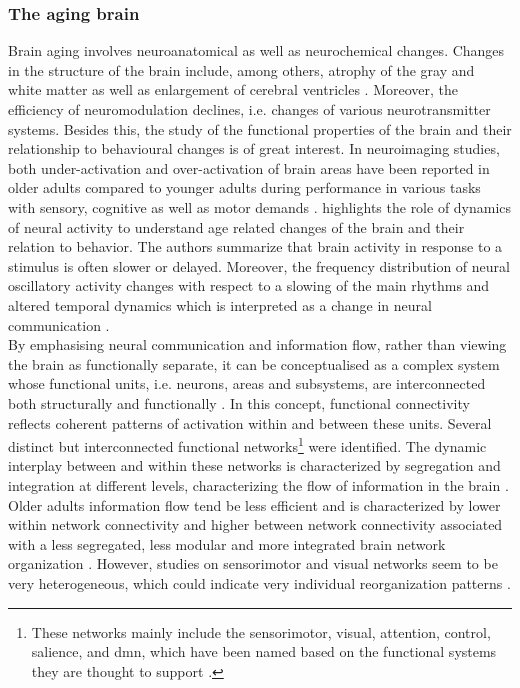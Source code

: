 \subsubsection{The aging brain}
Brain aging involves neuroanatomical as well as neurochemical changes. Changes in the structure of the brain include, among others, atrophy of the gray and white matter as well as enlargement of cerebral ventricles \cite{Fjell2010}. Moreover, the efficiency of neuromodulation declines, i.e. changes of various neurotransmitter systems. Besides this, the study of the functional properties of the brain and their relationship to behavioural changes is of great interest. In neuroimaging studies, both under-activation and over-activation of brain areas have been reported in older adults compared to younger adults during performance in various tasks with sensory, cognitive as well as motor demands \cite{Reuter-Lorenz2010, Sala-Llonch2015}. \citeauthor{Courtney2021} \cite{Courtney2021} highlights the role of dynamics of neural activity to understand age related changes of the brain and their relation to behavior. The authors summarize that brain activity in response to a stimulus is often slower or delayed. Moreover, the frequency distribution of neural oscillatory activity changes with respect to a slowing of the main rhythms and altered temporal dynamics which is interpreted as a change in neural communication \cite{Courtney2021}.\\ 
By emphasising neural communication and information flow, rather than viewing the brain as functionally separate, it can be conceptualised as a complex system whose functional units, i.e. neurons, areas and subsystems, are interconnected both structurally and functionally \cite{Friston2011,Deery2023}. In this concept, functional connectivity reflects coherent patterns of activation within and between these units. Several distinct but interconnected functional networks\footnote{These networks mainly include the sensorimotor, visual, attention, control, salience, and \gls{dmn}, which have been named based on the functional systems they are thought to support \cite{Uddin2019}.} were identified. The dynamic interplay between and within these networks is characterized by segregation and integration at different levels, characterizing the flow of information in the brain \cite{Sporns2013}. Older adults information flow tend be less efficient and is characterized by lower within network connectivity and higher between network connectivity associated with a less segregated, less modular and more integrated brain network organization \cite{Sala-Llonch2015,Deery2023, Betzel2014}. However, studies on sensorimotor and visual networks seem to be very heterogeneous, which could indicate very individual reorganization patterns \cite{Deery2023}.

